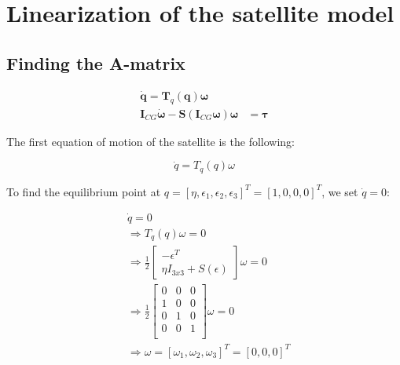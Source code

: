 \section{Linearization of the satellite model}

\subsection{Finding the A-matrix}
\begin{equation*}
\label{eq:dynamics}
	\begin{aligned}
		\dot{\mathbf{q}} = \mathbf{T}_q (\mathbf{q} ) \boldsymbol{\omega} \\
		\mathbf{I}_{CG} \dot{\boldsymbol{\omega}} - \mathbf{S} (\mathbf{I}_{CG} \boldsymbol{\omega} ) \boldsymbol{\omega} & =  \boldsymbol{\tau}
	\end{aligned}	
\end{equation*}

The first equation of motion of the satellite is the following:

\begin{equation*}
    \dot{q} = T_q(q)\omega
\end{equation*}


To find the equilibrium point at $q = [\eta,\epsilon_1,\epsilon_2,\epsilon_3]^T = [1,0,0,0]^T$, we set $\dot{q} = 0$:

\begin{equations}
    \begin{align*}
        &\dot{q} = 0\\
        &\Rightarrow T_q(q)\omega = 0\\
        &\Rightarrow \frac{1}{2}
        \begin{bmatrix}
            -\epsilon^T\\
            \eta I_{3x3} + S(\epsilon)
        \end{bmatrix}
        \omega = 0\\
        &\Rightarrow \frac{1}{2}
        \begin{bmatrix}
            0   &   0   &   0\\
            1   &   0   &   0\\
            0   &   1   &   0\\
            0   &   0   &   1\\  
        \end{bmatrix}
        \omega = 0\\
        &\Rightarrow \omega = [\omega_1,\omega_2,\omega_3]^T = [0,0,0]^T
    \end{align*}
\end{equations}

